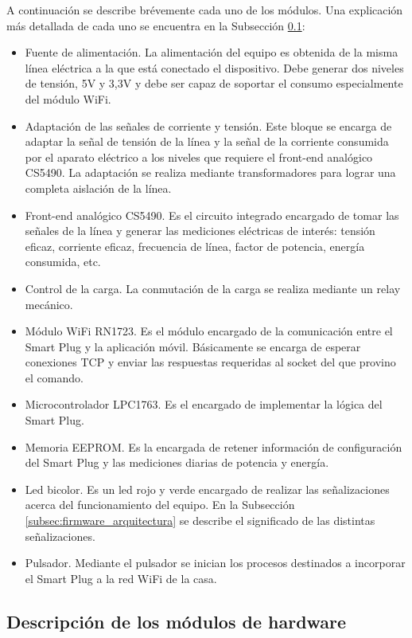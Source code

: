 A continuación se describe brévemente cada uno de los módulos. Una explicación más detallada de cada uno se encuentra en la Subsección \ref{subsec:detalles_hardware}:

\begin{itemize}
\item Fuente de alimentación. La alimentación del equipo es obtenida de la misma línea eléctrica a la que está conectado el dispositivo. Debe generar dos niveles de tensión, 5V y 3,3V y debe ser capaz de soportar el consumo especialmente del módulo WiFi.
\item Adaptación de las señales de corriente y tensión. Este bloque se encarga de adaptar la señal de tensión de la línea y la señal de la corriente consumida por el aparato eléctrico a los niveles que requiere el front-end analógico CS5490. La adaptación se realiza mediante transformadores para lograr una completa aislación de la línea.
\item Front-end analógico CS5490. Es el circuito integrado encargado de tomar las señales de la línea y generar las mediciones eléctricas de interés: tensión eficaz, corriente eficaz, frecuencia de línea, factor de potencia, energía consumida, etc.
\item Control de la carga. La conmutación de la carga se realiza mediante un relay mecánico.
\item Módulo WiFi RN1723. Es el módulo encargado de la comunicación entre el Smart Plug y la aplicación móvil. Básicamente se encarga de esperar conexiones TCP y enviar las respuestas requeridas al socket del que provino el comando.
\item Microcontrolador LPC1763. Es el encargado de implementar la lógica del Smart Plug. 
\item Memoria EEPROM. Es la encargada de retener información de configuración del Smart Plug y las mediciones diarias de potencia y energía.
\item Led bicolor. Es un led rojo y verde encargado de realizar las señalizaciones acerca del funcionamiento del equipo. En la Subsección \ref{subsec:firmware_arquitectura} se describe el significado de las distintas señalizaciones.
\item Pulsador. Mediante el pulsador se inician los procesos destinados a incorporar el Smart Plug a la red WiFi de la casa.
\end{itemize}

\subsection{Descripción de los módulos de hardware}
\label{subsec:detalles_hardware}

